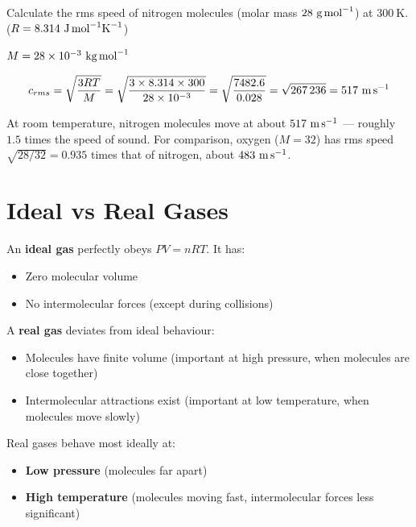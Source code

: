 \begin{examplebox}[14.6]
Calculate the rms speed of nitrogen molecules
(molar mass $28\ \text{g\,mol}^{-1}$) at $300\ \text{K}$.\\
($R = 8.314\ \text{J\,mol}^{-1}\text{K}^{-1}$)
\end{examplebox}

\begin{solutionbox}
$M = 28\times10^{-3}\ \text{kg\,mol}^{-1}$

\[
  c_{rms} = \sqrt{\frac{3RT}{M}}
  = \sqrt{\frac{3 \times 8.314 \times 300}
    {28\times10^{-3}}}
  = \sqrt{\frac{7482.6}{0.028}}
  = \sqrt{267\,236}
  = 517\ \text{m\,s}^{-1}
\]

At room temperature, nitrogen molecules move at
about $517\ \text{m\,s}^{-1}$ --- roughly $1.5$ times
the speed of sound. For comparison, oxygen ($M = 32$)
has rms speed $\sqrt{28/32} = 0.935$ times that of
nitrogen, about $483\ \text{m\,s}^{-1}$.
\end{solutionbox}

\section{Ideal vs Real Gases}

\begin{defbox}
An \textbf{ideal gas} perfectly obeys $PV = nRT$.
It has:
\begin{itemize}[noitemsep]
  \item Zero molecular volume
  \item No intermolecular forces (except during
  collisions)
\end{itemize}

A \textbf{real gas} deviates from ideal behaviour:
\begin{itemize}[noitemsep]
  \item Molecules have finite volume (important at
  high pressure, when molecules are close together)
  \item Intermolecular attractions exist (important
  at low temperature, when molecules move slowly)
\end{itemize}

Real gases behave most ideally at:
\begin{itemize}[noitemsep]
  \item \textbf{Low pressure} (molecules far apart)
  \item \textbf{High temperature} (molecules moving
  fast, intermolecular forces less significant)
\end{itemize}
\end{defbox}

